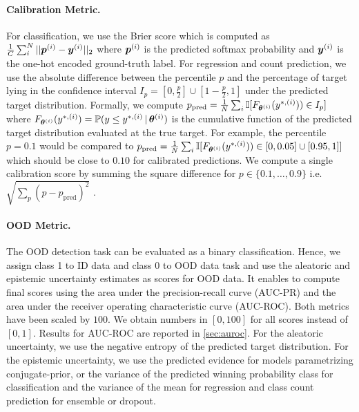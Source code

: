 \paragraph{Calibration Metric.} For classification, we use the Brier score which is computed as $\frac{1}{C}\sum^{N}_i ||\bm{p}^{(i)} - \bm{y}^{(i)}||_2$ where $\bm{p}^{(i)}$ is the predicted softmax probability and $\bm{y}^{(i)}$ is the one-hot encoded ground-truth label. For regression and count prediction, we use the absolute difference between the percentile $p$ and the percentage of target lying in the confidence interval $I_p=[0,\frac{p}{2}]\cup[1-\frac{p}{2},1]$ under the predicted target distribution. Formally, we compute $p_\text{pred} = \frac{1}{N}\sum_i \mathbb{I}[F_{\bm{\theta}^{(i)}}( y^{*, (i)})) \in I_p]$ where $F_{\bm{\theta}^{(i)}}(y^{*, (i)})=\mathbb{P}(y \leq y^{*, (i)} \,|\, \bm{\theta}^{(i)})$ is the cumulative function of the predicted target distribution evaluated at the true target. For example, the percentile $p=0.1$ would be compared to $p_\text{pred} = \frac{1}{N}\sum_i \mathbb{I}[F_{\bm{\theta}^{(i)}}( y^{*, (i)})) \in [0, 0.05] \cup [0.95, 1]]$ which should be close to $0.10$ for calibrated predictions. We compute a single calibration score by summing the square difference for $p \in \{0.1, \ldots, 0.9\}$ i.e.  $\sqrt{\sum_p (p - p_\text{pred})^2}$ \citep{accurate-uncertainties-deep-learning-regression}. 

\paragraph{OOD Metric.} The OOD detection task can be evaluated as a binary classification. Hence, we assign class 1 to ID data and class 0 to OOD data task and use the aleatoric and epistemic uncertainty estimates as scores for OOD data. It enables to compute final scores using the area under the precision-recall curve (AUC-PR) and the area under the receiver operating characteristic curve (AUC-ROC). Both metrics have been scaled by $100$. We obtain numbers in $[0, 100]$  for all scores instead of $[0, 1]$. Results for AUC-ROC are reported in \cref{sec:auroc}. For the aleatoric uncertainty, we use the negative entropy of the predicted target distribution. For the epistemic uncertainty, we use the predicted evidence for models parametrizing conjugate-prior, or the variance of the predicted winning probability class for classification and the variance of the mean for regression and class count prediction for ensemble or dropout.


